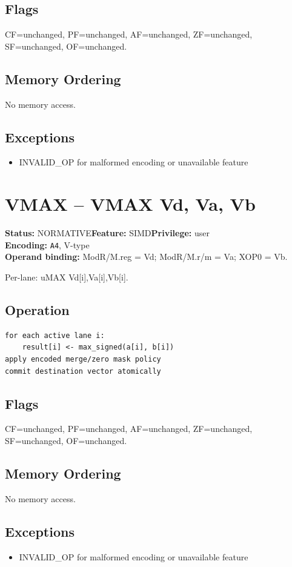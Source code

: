 \documentclass[10pt]{article}
\begin{document}
\subsection*{Flags}
CF=unchanged, PF=unchanged, AF=unchanged, ZF=unchanged, SF=unchanged, OF=unchanged.
\subsection*{Memory Ordering}
No memory access.
\subsection*{Exceptions}
\begin{itemize}
\item INVALID\_OP for malformed encoding or unavailable feature
\end{itemize}
\clearpage

\section{VMAX -- VMAX Vd, Va, Vb}
\textbf{Status:} NORMATIVE\quad \textbf{Feature:} SIMD\quad \textbf{Privilege:} user\\
\textbf{Encoding:} \texttt{A4}, V-type\\
\textbf{Operand binding:} ModR/M.reg = Vd; ModR/M.r/m = Va; XOP0 = Vb.

Per-lane: uMAX Vd[i],Va[i],Vb[i].

\subsection*{Operation}
\begin{lstlisting}
for each active lane i:
    result[i] <- max_signed(a[i], b[i])
apply encoded merge/zero mask policy
commit destination vector atomically
\end{lstlisting}
\subsection*{Flags}
CF=unchanged, PF=unchanged, AF=unchanged, ZF=unchanged, SF=unchanged, OF=unchanged.
\subsection*{Memory Ordering}
No memory access.
\subsection*{Exceptions}
\begin{itemize}
\item INVALID\_OP for malformed encoding or unavailable feature
\end{itemize}
\clearpage
\end{document}

